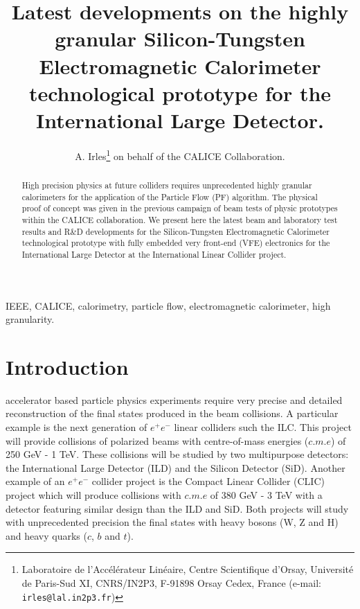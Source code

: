 \documentclass[journal]{IEEEtran}
\begin{document}
\title{Latest developments on the highly granular Silicon-Tungsten Electromagnetic Calorimeter technological prototype for the International Large Detector.}


\author{A. Irles\thanks{Laboratoire de l'Acc\'el\'erateur Lin\'eaire, Centre Scientifique d'Orsay, Universit\'e de Paris-Sud XI, CNRS/IN2P3, F-91898 Orsay Cedex, France (e-mail: \texttt{irles{@}lal.in2p3.fr})} on behalf of the CALICE Collaboration.}


\maketitle

\begin{abstract}
  High precision physics at future colliders requires unprecedented
  highly granular calorimeters for the application of the Particle
  Flow (PF) algorithm. 
  The physical proof of concept was given in the previous campaign
  of beam tests of physic prototypes within the CALICE collaboration.
  We present here the latest beam and laboratory test results and
  R\&D developments for the Silicon-Tungsten Electromagnetic Calorimeter
  technological prototype with fully embedded very front-end (VFE)
  electronics for the International Large Detector at the
  International Linear Collider project. 
\end{abstract}

\begin{IEEEkeywords}
IEEE, CALICE, calorimetry, particle flow, electromagnetic calorimeter, high granularity.
\end{IEEEkeywords}


\IEEEpeerreviewmaketitle

\section{Introduction}


 accelerator based particle physics experiments
require very precise and detailed reconstruction of the final states produced
in the beam collisions. A particular example is the next generation of $e^{+}e^{-}$
linear colliders such the ILC\cite{ilctdr}.
This project will provide collisions of polarized beams with centre-of-mass energies ($c.m.e$) of 250 GeV - 1 TeV.
These collisions will be studied by two multipurpose detectors:
the International Large Detector (ILD) and the Silicon Detector (SiD)\cite{Behnke:2013lya}.
Another example of an $e^{+}e^{-}$ collider project is the Compact Linear Collider (CLIC)
project\cite{clictdr} which will produce collisions with $c.m.e$ of 380 GeV - 3 TeV
with a detector featuring similar design than the ILD and SiD.
Both projects will study with unprecedented precision the final states with heavy bosons (W, Z  and H) and heavy quarks ($c$, $b$ and $t$).
\end{document}

